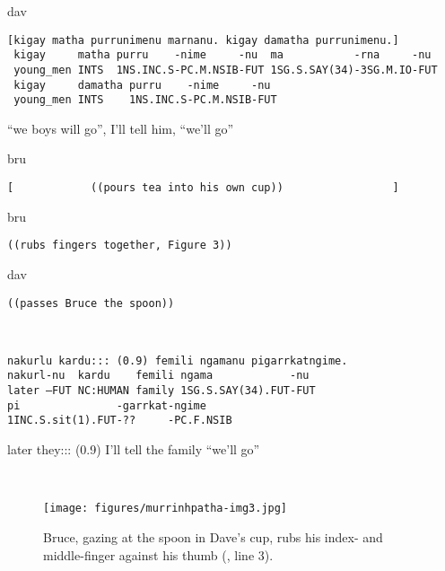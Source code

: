 \documentclass[output=paper,nonflat,colorlinks,citecolor=brown]{langsci/langscibook}
\begin{document}
\vspace{2mm}
%
\begin{transbox}{1}{dav}
\begin{verbatim}
[kigay matha purrunimenu marnanu. kigay damatha purrunimenu.]
 kigay     matha purru    -nime     -nu  ma           -rna     -nu
 young_men INTS  1NS.INC.S-PC.M.NSIB-FUT 1SG.S.SAY(34)-3SG.M.IO-FUT
 kigay     damatha purru    -nime     -nu
 young_men INTS    1NS.INC.S-PC.M.NSIB-FUT
\end{verbatim}
\hspace{0.07cm} “we boys will go”, I'll tell him, “we'll go”
\end{transbox}
%
\begin{transbox}{2}{bru}
\begin{verbatim}
[            ((pours tea into his own cup))                 ]
\end{verbatim}
\end{transbox}
%
\begin{mdframednoverticalspace}[style=firstfoc]
\begin{transbox}{3}{bru}
\begin{verbatim}
((rubs fingers together, Figure 3))
\end{verbatim}
\end{transbox}
\end{mdframednoverticalspace}
%
\begin{mdframednoverticalspace}[style=secondfoc]
\begin{transbox}{4}{dav}
\begin{verbatim}
((passes Bruce the spoon))
\end{verbatim}
\end{transbox}
\end{mdframednoverticalspace}\vspace{-2mm}
%
\begin{transbox}{5}{~}
\begin{verbatim}
nakurlu kardu::: (0.9) femili ngamanu pigarrkatngime.
nakurl-nu  kardu    femili ngama            -nu
later –FUT NC:HUMAN family 1SG.S.SAY(34).FUT-FUT
pi               -garrkat-ngime
1INC.S.sit(1).FUT-??     -PC.F.NSIB
\end{verbatim}
later they::: (0.9) I'll tell the family “we'll go”
\end{transbox}\\
%
\begin{figure}
\texttt{[image: figures/murrinhpatha-img3.jpg]}
\caption{Bruce, gazing at the spoon in Dave’s cup, rubs his index- and middle-finger against his thumb (, line 3).
\label{fig:blythe:3}
}\end{figure}
\end{document}
